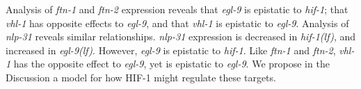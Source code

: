 \documentclass[9pt,twocolumn,twoside,lineno]{pnas-new}
\newcommand{\cel}{\emph{C.~elegans}}
\newcommand{\gene}[1]{\emph{#1}}
\newcommand{\nlp}{\emph{\mbox{nlp-31}}}
\newcommand{\ftna}{\emph{\mbox{ftn-1}}}
\newcommand{\ftnb}{\emph{\mbox{ftn-2}}}
\newcommand{\egl}{\emph{\mbox{egl-9}(lf)}}
\newcommand{\hif}{\emph{\mbox{hif-1(lf)}}}
\newcommand{\hifp}{HIF-1}
\begin{document}
Analysis of \ftna{} and \ftnb{} expression reveals that \gene{egl-9} is
epistatic to \gene{hif-1}; that \gene{vhl-1} has opposite effects to
\gene{egl-9}, and that \gene{vhl-1} is epistatic to \gene{egl-9}. Analysis of
\nlp{} reveals similar relationships. \nlp{} expression is decreased in \hif{},
and increased in \egl{}. However, \gene{egl-9} is epistatic to \gene{hif-1}.
Like \ftna{} and \ftnb{}, \gene{vhl-1} has the opposite effect to \gene{egl-9},
yet is epistatic to \gene{egl-9}. We propose in the Discussion a model for how
\hifp{} might regulate these targets.

%
%
%
\end{document}
